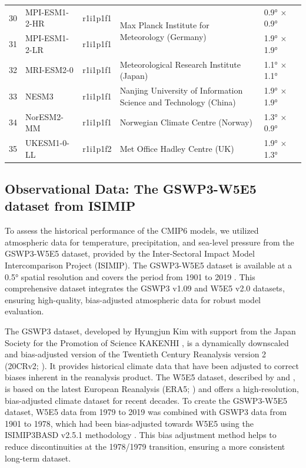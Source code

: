\documentclass[pdflatex,sn-chicago]{sn-jnl}%
\theoremstyle{thmstyleone}%
\theoremstyle{thmstyletwo}%
\theoremstyle{thmstylethree}%
\begin{document}
\begin{table}
{\begin{tabularx}{1.27\textwidth}{p{.5cm} p{2.6cm} p{1.1cm} p{5.7cm} p{1.5cm} l}
\midrule
30 & MPI-ESM1-2-HR & r1i1p1f1 & \multirow{2}{=}{Max Planck Institute for Meteorology (Germany)} & 0.9° × 0.9° & \citet{MPI-ESM1.2-HR} \\
31 & MPI-ESM1-2-LR & r1i1p1f1 & & 1.9° × 1.9° & \citet{MPI‐ESM1.2-LR} \\
\midrule
32 & MRI-ESM2-0 & r1i1p1f1 & Meteorological Research Institute (Japan) & 1.1° × 1.1° & \citet{MRI-ESM2} \\
\midrule
33 & NESM3 & r1i1p1f1 & Nanjing University of Information Science and Technology (China) & 1.9° × 1.9° & \citet{NESM3} \\
\midrule
34 & NorESM2-MM & r1i1p1f1 & Norwegian Climate Centre (Norway) & 1.3° × 0.9° & \citet{NorESM2} \\
\midrule
35 & UKESM1-0-LL & r1i1p1f2 & Met Office Hadley Centre (UK) & 1.9° × 1.3° & \citep{UKESM1} \\
\bottomrule
\end{tabularx}}
\end{table}


\subsection{Observational Data: The GSWP3-W5E5 dataset from ISIMIP}
To assess the historical performance of the CMIP6 models, we utilized atmospheric data for temperature, precipitation, and sea-level pressure from the GSWP3-W5E5 dataset, provided by the Inter-Sectoral Impact Model Intercomparison Project (ISIMIP). The GSWP3-W5E5 dataset is available at a 0.5° spatial resolution and covers the period from 1901 to 2019 \citep{Lange-ISIMIP-2023}. This comprehensive dataset integrates the GSWP3 v1.09 and W5E5 v2.0 datasets, ensuring high-quality, bias-adjusted atmospheric data for robust model evaluation.

The GSWP3 dataset, developed by Hyungjun Kim with support from the Japan Society for the Promotion of Science KAKENHI \citep{Dirmeyer-GSWP3-2006}, is a dynamically downscaled and bias-adjusted version of the Twentieth Century Reanalysis version 2 (20CRv2; \citet{Compo-2011}). It provides historical climate data that have been adjusted to correct biases inherent in the reanalysis product. The W5E5 dataset, described by \citet{Cucchi-2020} and \citet{Lange-WFFE5-2021}, is based on the latest European Reanalysis (ERA5; \citet{Hersbach-ERA5-2020}) and offers a high-resolution, bias-adjusted climate dataset for recent decades. To create the GSWP3-W5E5 dataset, W5E5 data from 1979 to 2019 was combined with GSWP3 data from 1901 to 1978, which had been bias-adjusted towards W5E5 using the ISIMIP3BASD v2.5.1 methodology \citep{Lange-ISIMIP3BASD-2019, Lange-ISIMIP3BASD-2020}. This bias adjustment method helps to reduce discontinuities at the 1978/1979 transition, ensuring a more consistent long-term dataset.
\end{document}
